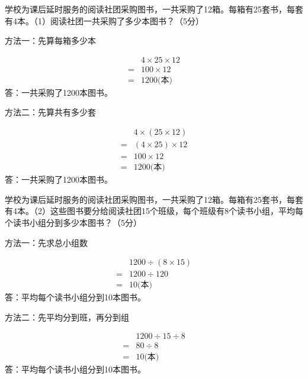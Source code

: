 学校为课后延时服务的阅读社团采购图书，一共采购了12箱。每箱有25套书，每套有4本。（1）阅读社团一共采购了多少本图书？（5分）\par
\begin{BookAnswer}
方法一：先算每箱多少本\par \[\begin{aligned} &4\times25\times12\\={}&100\times12\\={}&1200\text{(本)}\end{aligned}\]答：一共采购了1200本图书。\par 方法二：先算共有多少套\par \[\begin{aligned}&4\times(25\times12)\\={}&(4\times25)\times12\\={}&100\times12\\={}&1200\text{(本)}\end{aligned}\]答：一共采购了1200本图书。\par
\end{BookAnswer}

学校为课后延时服务的阅读社团采购图书，一共采购了12箱。每箱有25套书，每套有4本。（2）这些图书要分给阅读社团15个班级，每个班级有8个读书小组，平均每个读书小组分到多少本图书？（5分）\par
\begin{BookAnswer}
方法一：先求总小组数\par \[\begin{aligned} &1200\div(8\times15)\\={}&1200\div120\\={}&10\text{(本)}\end{aligned}\]答：平均每个读书小组分到10本图书。\par 方法二：先平均分到班，再分到组\par \[\begin{aligned} &1200\div15\div8\\={}&80\div8\\={}&10\text{(本)}\end{aligned}\]答：平均每个读书小组分到10本图书。\par
\end{BookAnswer}

